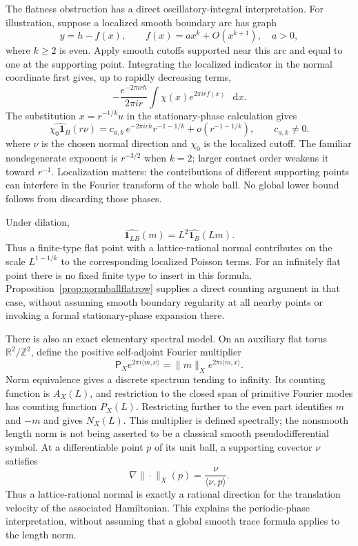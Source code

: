 \documentclass[11pt,a4paper]{article}
\numberwithin{equation}{section}
\theoremstyle{definition}
\theoremstyle{remark}
\newcommand{\dd}{\mathop{}\!\mathrm d}
\newcommand{\RR}{\mathbb R}
\newcommand{\ZZ}{\mathbb Z}
\begin{document}
The flatness obstruction has a direct oscillatory-integral interpretation.
For illustration, suppose a localized smooth boundary arc has graph
\[
 y=h-f(x),\qquad f(x)=a x^k+O(x^{k+1}),\quad a>0,
\]
where $k\geq2$ is even. Apply smooth cutoffs supported near this arc
and equal to one at the supporting point. Integrating the localized
indicator in the normal coordinate first gives, up to rapidly decreasing
terms,
\[
 -\frac{e^{-2\pi i r h}}{2\pi i r}
       \int \chi(x)e^{2\pi i r f(x)}\,\dd x.
\]
The substitution $x=r^{-1/k}u$ in the stationary-phase calculation gives
\begin{equation}
 \widehat{\chi_0\mathbf1_B}(r\nu)
   =c_{a,k}\,e^{-2\pi i r h}r^{-1-1/k}
     +o(r^{-1-1/k}),\qquad c_{a,k}\ne0.
 \label{eq:normballfinitephase}
\end{equation}
where $\nu$ is the chosen normal direction and $\chi_0$ is the localized
cutoff. The familiar nondegenerate exponent is $r^{-3/2}$ when $k=2$;
larger contact order weakens it toward $r^{-1}$. Localization matters:
the contributions of different supporting points can interfere in the
Fourier transform of the whole ball. No global lower bound follows from
discarding those phases.

Under dilation,
\[
 \widehat{\mathbf1_{LB}}(m)=L^2\widehat{\mathbf1_B}(Lm).
\]
Thus a finite-type flat point with a lattice-rational normal contributes
on the scale $L^{1-1/k}$ to the corresponding localized Poisson terms.
For an infinitely flat point there is no fixed finite type to insert in
this formula. Proposition~\ref{prop:normballflatrow} supplies a direct
counting argument in that case, without assuming smooth boundary
regularity at all nearby points or invoking a formal stationary-phase
expansion there.

There is also an exact elementary spectral model. On an auxiliary flat
torus $\RR^2/\ZZ^2$, define the positive self-adjoint Fourier multiplier
\[
 \mathsf P_X e^{2\pi i\langle m,x\rangle}
   =\|m\|_X e^{2\pi i\langle m,x\rangle}.
\]
Norm equivalence gives a discrete spectrum tending to infinity. Its
counting function is $A_X(L)$, and restriction to the closed span of
primitive Fourier modes has counting function $P_X(L)$. Restricting
further to the even part identifies $m$ and $-m$ and gives $N_X(L)$.
This multiplier is defined spectrally; the nonsmooth length norm is not
being asserted to be a classical smooth pseudodifferential symbol.
At a differentiable point $p$ of its unit ball, a supporting covector
$\nu$ satisfies
\[
 \nabla\|\cdot\|_X(p)=\frac{\nu}{\langle\nu,p\rangle}.
\]
Thus a lattice-rational normal is exactly a rational direction for the
translation velocity of the associated Hamiltonian. This explains the
periodic-phase interpretation, without assuming that a global smooth
trace formula applies to the length norm.
\end{document}

